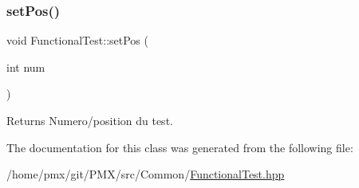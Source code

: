 \subsubsection{\texorpdfstring{set\+Pos()}{setPos()}}
{\footnotesize\ttfamily void Functional\+Test\+::set\+Pos (\begin{DoxyParamCaption}\item[{int}]{num }\end{DoxyParamCaption})\hspace{0.3cm}{\ttfamily [inline]}}

\begin{DoxyReturn}{Returns}
Numero/position du test. 
\end{DoxyReturn}


The documentation for this class was generated from the following file\+:\begin{DoxyCompactItemize}
\item 
/home/pmx/git/\+P\+M\+X/src/\+Common/\hyperlink{FunctionalTest_8hpp}{Functional\+Test.\+hpp}\end{DoxyCompactItemize}
